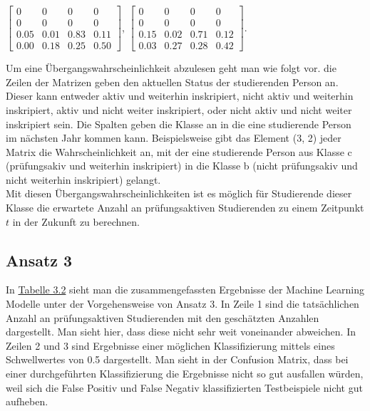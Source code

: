 $\left[ \begin{array}{rrrr} 0 & 0 & 0 & 0 \\  0 & 0 & 0 & 0 \\ 0.05 & 0.01 & 0.83 & 0.11\\ 0.00& 0.18 & 0.25 & 0.50\end{array}\right]$,
$\left[ \begin{array}{rrrr} 0 & 0 & 0 & 0 \\  0 & 0 & 0 & 0 \\ 0.15& 0.02& 0.71& 0.12\\ 0.03& 0.27& 0.28& 0.42 \end{array}\right]$.

Um eine \"Ubergangswahrscheinlichkeit abzulesen geht man wie folgt vor. die Zeilen der Matrizen geben den aktuellen Status der studierenden Person an.
Dieser kann entweder \glqq aktiv und weiterhin inskripiert\grqq{}, \glqq nicht aktiv und weiterhin inskripiert\grqq{}, \glqq aktiv und nicht weiter inskripiert\grqq{}, oder \glqq nicht aktiv und nicht weiter inskripiert\grqq{} sein.
Die Spalten geben die Klasse an in die eine studierende Person im n\"achsten Jahr kommen kann. Beispielsweise gibt das Element (3, 2) jeder Matrix die Wahrscheinlichkeit an,
mit der eine studierende Person aus Klasse c (pr\"ufungsakiv und weiterhin inskripiert) in die Klasse b (nicht pr\"ufungsakiv und nicht weiterhin inskripiert) gelangt.\\


Mit diesen \"Ubergangswahrscheinlichkeiten ist es m\"oglich f\"ur Studierende dieser Klasse die erwartete Anzahl an pr\"ufungsaktiven Studierenden
zu einem Zeitpunkt $t$ in der Zukunft zu berechnen.

\subsection{Ansatz 3}

In \hyperref[tab:ergebnisA3P1]{Tabelle 3.2} sieht man die zusammengefassten Ergebnisse der  Machine Learning Modelle unter der Vorgehensweise von Ansatz 3.
In Zeile 1 sind die tats\"achlichen Anzahl an pr\"ufungsaktiven Studierenden mit den gesch\"atzten Anzahlen dargestellt. Man sieht hier, dass diese nicht sehr weit voneinander abweichen.
In Zeilen 2 und 3 sind Ergebnisse einer m\"oglichen Klassifizierung mittels eines Schwellwertes von 0.5 dargestellt. Man sieht in der Confusion Matrix, dass bei einer
durchgef\"uhrten Klassifizierung die Ergebnisse nicht so gut ausfallen w\"urden, weil sich die False Positiv und False Negativ klassifizierten Testbeispiele nicht gut aufheben.

